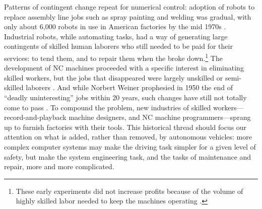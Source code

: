 Patterns of contingent change repeat for
numerical control: adoption of robots to replace assembly line jobs such
as spray painting and welding was gradual, with only
about 6,000 robots in use in American factories by the mid
1970s \cite[p. 159]{nyeAmericas}. Industrial robots, while automating tasks,
had a way of generating large contingents of skilled human laborers
who still needed to be paid for their services:  to tend them, and
to repair them when the broke down.\footnote{These early experiments did not
increase profits because of the volume of highly skilled labor needed
to keep the machines operating \cite[p. 162]{nyeAmericas}.} The development of NC machines
proceeded with a specific interest in eliminating skilled workers, but
the jobs that disappeared were largely unskilled or semi-skilled
laborers \cite[p. 164]{nyeAmericas}. And while Norbert Weiner
prophesied in 1950 the end of ``deadly uninteresting'' jobs within 20
years, such changes have still not 
totally come to pass \cite[p. 161]{nyeAmericas}. To compound the problem, new industries of
skilled workers---record-and-playback machine designers, and NC machine
programmers---sprang up to furnish factories with their tools. This
historical thread should focus our attention on what is added, rather
than removed, by
autonomous vehicles: more complex computer systems may make the driving
task simpler for a given level of safety, but make the system
engineering task, and the tasks of maintenance and repair, more and more complicated.



